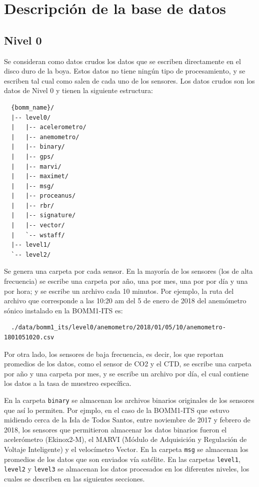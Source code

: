 \documentclass[11pt]{article}
\begin{document}


\section{Descripción de la base de datos}%
\label{sec:descripcion_de_la_base_de_datos}

\subsection{Nivel 0} 
\label{sub:nivel_0}

Se consideran como datos crudos los datos que se escriben directamente en el
disco duro de la boya. Estos datos no tiene ningún tipo de procesamiento, y se
escriben tal cual como salen de cada uno de los sensores.  Los datos crudos son
los datos de Nivel 0 y tienen la siguiente estructura:

\begin{verbatim}
  {bomm_name}/
  |-- level0/
  |   |-- acelerometro/
  |   |-- anemometro/
  |   |-- binary/
  |   |-- gps/
  |   |-- marvi/
  |   |-- maximet/
  |   |-- msg/
  |   |-- proceanus/
  |   |-- rbr/
  |   |-- signature/
  |   |-- vector/
  |   `-- wstaff/
  |-- level1/
  `-- level2/
\end{verbatim}

Se genera una carpeta por cada sensor. En la mayoría de los sensores (los de alta
frecuencia) se escribe una carpeta por año, una por mes, una por por día y una por
hora; y se escribe un archivo cada 10 minutos. Por ejemplo, la ruta del archivo que
corresponde a las 10:20 am del 5 de enero de 2018 del anemómetro sónico
instalado en la BOMM1-ITS es:

\begin{verbatim}
  ./data/bomm1_its/level0/anemometro/2018/01/05/10/anemometro-1801051020.csv
\end{verbatim}

Por otra lado, los sensores de baja frecuencia, es decir, los que reportan
promedios de los datos, como el sensor de CO2 y el CTD, se escribe una carpeta
por año y una carpeta por mes, y se escribe un archivo por día, el cual contiene
los datos a la tasa de muestreo específica.

En la carpeta \texttt{binary} se almacenan los archivos binarios originales de
los sensores que así lo permiten. Por ejmplo, en el caso de la BOMM1-ITS que
estuvo midiendo cerca de la Isla de Todos Santos, entre noviembre de 2017 y
febrero de 2018, los sensores que permitieron almacenar los datos binarios
fueron el acelerómetro (Ekinox2-M), el MARVI (Módulo de Adquisición y Regulación
de Voltaje Inteligente) y el velocímetro Vector. En la carpeta \texttt{msg} se
almacenan los promedios de los datos que son enviados vía satélite. En las
carpetas \texttt{level1}, \texttt{level2} y \texttt{level3} se almacenan los
datos procesados en los diferentes niveles, los cuales se describen en las
siguientes secciones.
\end{document}
